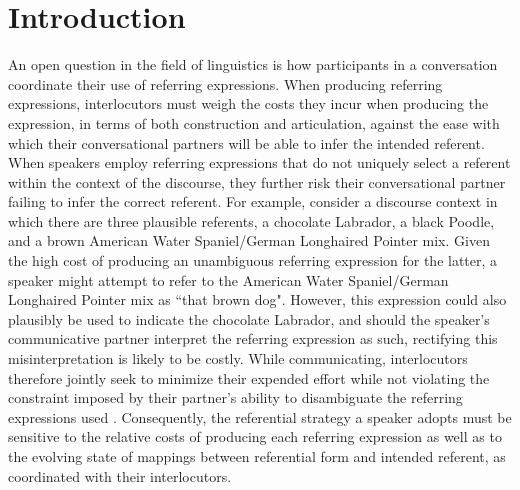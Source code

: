 \documentclass[12pt,a4paper]{article}
\begin{document}
\section{Introduction}
An open question in the field of linguistics is how participants in a conversation coordinate their use of referring expressions. When producing referring expressions, interlocutors must weigh the costs they incur when producing the expression, in terms of both construction and articulation, against the ease with which their conversational partners will be able to infer the intended referent. When speakers employ referring expressions that do not uniquely select a referent within the context of the discourse, they further risk their conversational partner failing to infer the correct referent. For example, consider a discourse context in which there are three plausible referents, a chocolate Labrador, a black Poodle, and a brown American Water Spaniel/German Longhaired Pointer mix. Given the high cost of producing an unambiguous referring expression for the latter, a speaker might attempt to refer to the American Water Spaniel/German Longhaired Pointer mix as ``that brown dog". However, this expression could also plausibly be used to indicate the chocolate Labrador, and should the speaker's communicative partner interpret the referring expression as such, rectifying this misinterpretation is likely to be costly. While communicating, interlocutors therefore jointly seek to minimize their expended effort while not violating the constraint imposed by their partner's ability to disambiguate the referring expressions used \citep{benz2005}. Consequently, the referential strategy a speaker adopts must be sensitive to the relative costs of producing each referring expression as well as to the evolving state of mappings between referential form and intended referent, as coordinated with their interlocutors. 
\end{document}
